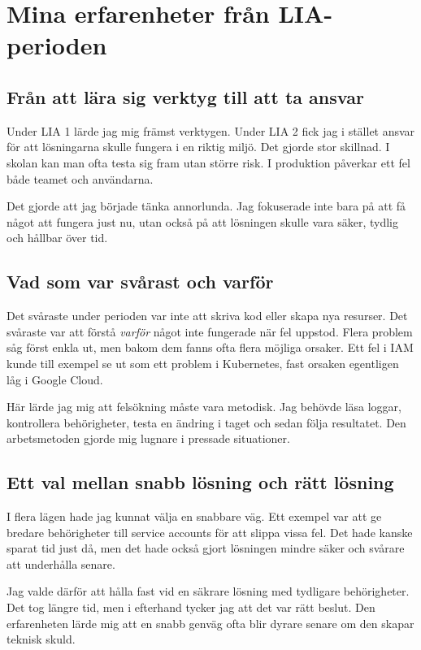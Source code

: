 \section{Mina erfarenheter från LIA-perioden}
\label{sec:erfarenheter}

\subsection*{Från att lära sig verktyg till att ta ansvar}

Under LIA 1 lärde jag mig främst verktygen. Under LIA 2 fick jag i stället ansvar för att
lösningarna skulle fungera i en riktig miljö. Det gjorde stor skillnad. I skolan kan man ofta
testa sig fram utan större risk. I produktion påverkar ett fel både teamet och användarna.

Det gjorde att jag började tänka annorlunda. Jag fokuserade inte bara på att få något att fungera
just nu, utan också på att lösningen skulle vara säker, tydlig och hållbar över tid.

\subsection*{Vad som var svårast och varför}

Det svåraste under perioden var inte att skriva kod eller skapa nya resurser. Det svåraste var
att förstå \textit{varför} något inte fungerade när fel uppstod. Flera problem såg först enkla ut,
men bakom dem fanns ofta flera möjliga orsaker. Ett fel i IAM kunde till exempel se ut som ett
problem i Kubernetes, fast orsaken egentligen låg i Google Cloud.

Här lärde jag mig att felsökning måste vara metodisk. Jag behövde läsa loggar, kontrollera
behörigheter, testa en ändring i taget och sedan följa resultatet. Den arbetsmetoden gjorde mig
lugnare i pressade situationer.

\subsection*{Ett val mellan snabb lösning och rätt lösning}

I flera lägen hade jag kunnat välja en snabbare väg. Ett exempel var att ge bredare behörigheter
till service accounts för att slippa vissa fel. Det hade kanske sparat tid just då, men det hade
också gjort lösningen mindre säker och svårare att underhålla senare.

Jag valde därför att hålla fast vid en säkrare lösning med tydligare behörigheter. Det tog längre
tid, men i efterhand tycker jag att det var rätt beslut. Den erfarenheten lärde mig att en snabb
genväg ofta blir dyrare senare om den skapar teknisk skuld.

